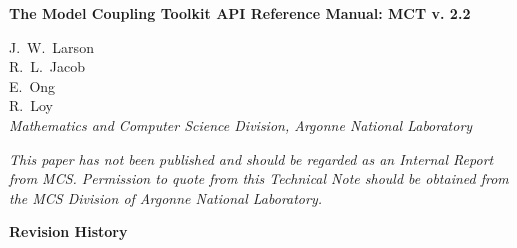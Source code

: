\documentclass{article}
\begin{document}
\begin{sloppypar}
{\huge\bf
The Model Coupling Toolkit API Reference Manual: MCT v. 2.2
\\ }                     %
\end{sloppypar}

\vspace{.3in}
\noindent J.~W.~Larson\\
R.~L.~Jacob\\
E.~Ong\\
R.~Loy\\
\vspace{.2in} {\em Mathematics and Computer Science Division,
Argonne National Laboratory\\}

\vfill

{\em This paper has not been published and should  be regarded as
an Internal Report from MCS. Permission to quote from this
Technical Note should be  obtained from the MCS Division of
Argonne National Laboratory.}

\vspace{0.4in}


\thispagestyle{empty}
\newpage




\newpage
\setcounter{page}{2}     %


\vspace*{\fill}

\centerline{\huge\bf Revision History}

\bigskip
{}
\end{document}
